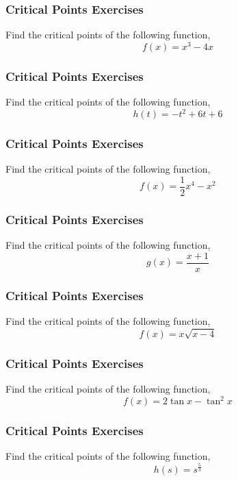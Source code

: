 \documentclass[xcolor=dvipsnames]{beamer}
\begin{document}
\begin{frame}
  \frametitle{Critical Points Exercises}
{\ubung} Find the critical points of the following function,
\begin{equation}
  \label{eq:xoongohh}
f(x)=x^{3}-4x
\end{equation}
\end{frame}

\begin{frame}
  \frametitle{Critical Points Exercises}
{\ubung} Find the critical points of the following function,
\begin{equation}
  \label{eq:aghuomoh}
h(t)=-t^{2}+6t+6
\end{equation}
\end{frame}

\begin{frame}
  \frametitle{Critical Points Exercises}
{\ubung} Find the critical points of the following function,
\begin{equation}
  \label{eq:yakovuap}
f(x)=\frac{1}{2}x^{4}-x^{2}
\end{equation}
\end{frame}

\begin{frame}
  \frametitle{Critical Points Exercises}
{\ubung} Find the critical points of the following function,
\begin{equation}
  \label{eq:aweefahx}
g(x)=\frac{x+1}{x}
\end{equation}
\end{frame}

\begin{frame}
  \frametitle{Critical Points Exercises}
{\ubung} Find the critical points of the following function,
\begin{equation}
  \label{eq:ebukatio}
f(x)=x\sqrt{x-4}
\end{equation}
\end{frame}

\begin{frame}
  \frametitle{Critical Points Exercises}
{\ubung} Find the critical points of the following function,
\begin{equation}
  \label{eq:ebukatio}
f(x)=2\tan{}x-\tan^{2}x
\end{equation}
\end{frame}

\begin{frame}
  \frametitle{Critical Points Exercises}
{\ubung} Find the critical points of the following function,
\begin{equation}
  \label{eq:inaidimo}
h(s)=s^{\frac{5}{3}}
\end{equation}
\end{frame}
\end{document}
